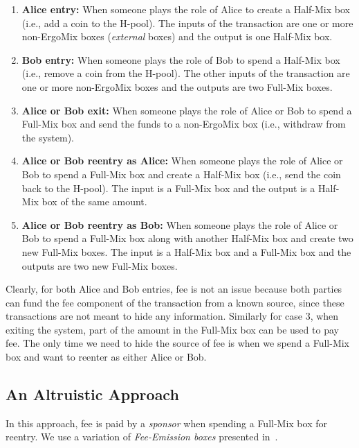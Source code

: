 \documentclass[11pt]{article}
\newcommand{\mixname}{ErgoMix\xspace}
\begin{document}
\begin{enumerate}
    \item \textbf{Alice entry:} When someone plays the role of Alice to create a Half-Mix box (i.e., add a coin to the H-pool). The inputs of the transaction are one or more non-\mixname boxes ({\em external} boxes) and the output is one Half-Mix box. 
    \item \textbf{Bob entry:} When someone plays the role of Bob to spend a Half-Mix box (i.e., remove a coin from the H-pool). The other inputs of the transaction are one or more non-\mixname boxes and the outputs are two Full-Mix boxes. 
    \item \textbf{Alice or Bob exit:} When someone plays the role of Alice or Bob to spend a Full-Mix box and send the funds to a non-\mixname box (i.e., withdraw from the system). 
    \item \textbf{Alice or Bob reentry as Alice:} When someone plays the role of Alice or Bob to spend a Full-Mix box and create a Half-Mix box (i.e., send the coin back to the H-pool). The input is a Full-Mix box and the output is a Half-Mix box of the same amount.
    \item \textbf{Alice or Bob reentry as Bob:} When someone plays the role of Alice or Bob to spend a Full-Mix box along with another Half-Mix box and create two new Full-Mix boxes. The input is a Half-Mix box and a Full-Mix box and the outputs are two new Full-Mix boxes.
\end{enumerate}

Clearly, for both Alice and Bob entries, fee is not an issue because both parties can fund the fee component of the transaction from a known source, since these transactions are not meant to hide any information. Similarly for case 3, when exiting the system, part of the amount in the Full-Mix box can be used to pay fee. The only time we need to hide the source of fee is when we spend a Full-Mix box and want to reenter as either Alice or Bob. 

\subsection{An Altruistic Approach}
\label{donation}

In this approach, fee is paid by a {\em sponsor} when spending a Full-Mix box for reentry. 
We use a variation of {\em Fee-Emission boxes} presented in~\cite{Fee-Emission}. 
\end{document}
